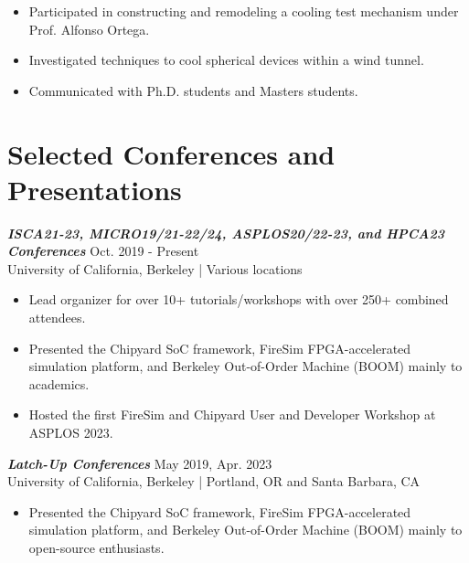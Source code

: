 \documentclass[letter]{res}
\begin{document}
\begin{resume}
 \begin{itemize}
 \item Participated in constructing and remodeling a cooling test mechanism under Prof. Alfonso Ortega.
 \item Investigated techniques to cool spherical devices within a wind tunnel.
 \item Communicated with Ph.D. students and Masters students.
 \end{itemize}

\vspace{-4mm}

\section{Selected Conferences and Presentations}

{\sl \textbf{ISCA21-23, MICRO19/21-22/24, ASPLOS20/22-23, and HPCA23 Conferences}} \hfill Oct. 2019 - Present\\
 University of California, Berkeley | Various locations \newline

 \vspace{-4mm}

 \begin{itemize}
 \item Lead organizer for over 10+ tutorials/workshops with over 250+ combined attendees.
 \item Presented the Chipyard SoC framework, FireSim FPGA-accelerated simulation platform, and \newline Berkeley Out-of-Order Machine (BOOM) mainly to academics.
 \item Hosted the first FireSim and Chipyard User and Developer Workshop at ASPLOS 2023.
 \end{itemize}

\vspace{-2mm}

{\sl \textbf{Latch-Up Conferences}} \hfill May 2019, Apr. 2023 \\
 University of California, Berkeley | Portland, OR and Santa Barbara, CA \newline

 \vspace{-4mm}

 \begin{itemize}
 \item Presented the Chipyard SoC framework, FireSim FPGA-accelerated simulation platform, and \newline Berkeley Out-of-Order Machine (BOOM) mainly to open-source enthusiasts.
 \end{itemize}


\end{resume}
\end{document}
